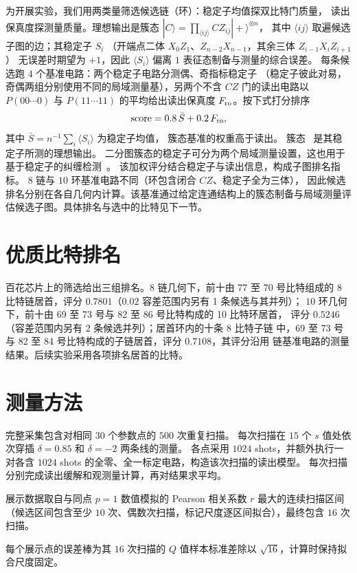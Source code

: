 为开展实验，我们用两类量筛选候选链（环）：稳定子均值探双比特门质量，
读出保真度探测量质量。理想输出是簇态
$|C\rangle=\prod_{\langle ij\rangle}CZ_{ij}|+\rangle^{\otimes n}$，
其中 $\langle ij\rangle$ 取遍候选子图的边；其稳定子 $S_i$
（开端点二体 $X_0Z_1$、$Z_{n-2}X_{n-1}$，其余三体 $Z_{i-1}X_iZ_{i+1}$）
无误差时期望为 $+1$，因此 $\langle S_i\rangle$ 偏离 $1$ 表征态制备与测量的综合误差。
每条候选跑 $4$ 个基准电路：两个稳定子电路分测偶、奇指标稳定子
（稳定子彼此对易，奇偶两组分别使用不同的局域测量基），另两个不含 $CZ$ 门的读出电路以
$P(00\cdots0)$ 与 $P(11\cdots11)$ 的平均给出读出保真度
$F_{\rm ro}$。按下式打分排序
\begin{equation}
{\rm score}=0.8\,\bar{S}+0.2\,F_{\rm ro},
\end{equation}
其中 $\bar{S}=n^{-1}\sum_i\langle S_i\rangle$ 为稳定子均值，
簇态基准的权重高于读出。
簇态~\cite{raussendorf2001oneway} 是其稳定子所测的理想输出。
二分图簇态的稳定子可分为两个局域测量设置，这也用于基于稳定子的纠缠检测~\cite{toth2005detecting}。
该加权评分结合稳定子与读出信息，构成子图排名指标。
$8$ 链与 $10$ 环基准电路不同（环包含闭合 $CZ$、稳定子全为三体），
因此候选排名分别在各自几何内计算。该基准通过给定连通结构上的簇态制备与局域测量评估候选子图。具体排名与选中的比特见下一节。

\section{优质比特排名}
\label{sec:rankings}

百花芯片上的筛选给出三组排名。$8$ 链几何下，前十由 77 至 70 号比特组成的
8 比特链居首，评分 $0.7801$（$0.02$ 容差范围内另有 1 条候选与其并列）；
$10$ 环几何下，前十由 69 至 73 号与 82 至 86 号比特构成的 10 比特环居首，
评分 $0.5246$（容差范围内另有 2 条候选并列）；居首环内的十条 $8$ 比特子链
中，69 至 73 号与 82 至 84 号比特构成的子链居首，评分 $0.7108$，其评分沿用
链基准电路的测量结果。后续实验采用各项排名居首的比特。



\section{测量方法}
\label{sec:acquisition}

完整采集包含对相同 $30$ 个参数点的 $500$ 次重复扫描。
每次扫描在 $15$ 个 $s$ 值处依次穿插 $\delta=0.85$ 和 $\delta=-2$ 两条线的测量。
各点采用 $1024$ shots，并额外执行一对各含 $1024$ shots 的全零、全一标定电路，构造该次扫描的读出模型。
每次扫描分别完成读出缓解和观测量计算，再对结果求平均。

展示数据取自与同点 $p=1$ 数值模拟的 Pearson 相关系数 $r$ 最大的连续扫描区间（候选区间包含至少 $10$ 次、偶数次扫描，标记尺度逐区间拟合），最终包含 $16$ 次扫描。

每个展示点的误差棒为其 $16$ 次扫描的 $Q$ 值样本标准差除以 $\sqrt{16}$，计算时保持拟合尺度固定。

